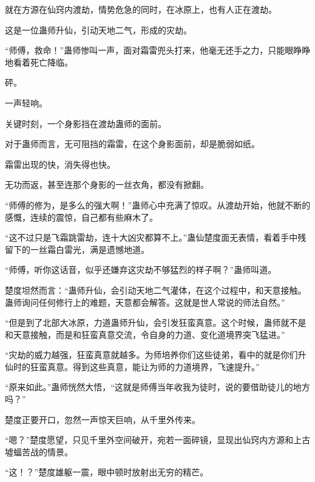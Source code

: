 \begin{this_body}
就在方源在仙窍内渡劫，情势危急的同时，在冰原上，也有人正在渡劫。

这是一位蛊师升仙，引动天地二气，形成的灾劫。

“师傅，救命！”蛊师惨叫一声，面对霜雷兜头打来，他毫无还手之力，只能眼睁睁地看着死亡降临。

砰。

一声轻响。

关键时刻，一个身影挡在渡劫蛊师的面前。

对于蛊师而言，无可阻挡的霜雷，在这个身影面前，却是脆弱如纸。

霜雷出现的快，消失得也快。

无功而返，甚至连那个身影的一丝衣角，都没有掀翻。

“师傅的修为，是多么的强大啊！”蛊师心中充满了惊叹。从渡劫开始，他就不断的感慨，连续的震惊，自己都有些麻木了。

“这不过只是飞霜跳雷劫，连十大凶灾都算不上。”蛊仙楚度面无表情，看着手中残留下的一丝霜白雷光，满是遗憾地道。

“师傅，听你这话音，似乎还嫌弃这灾劫不够猛烈的样子啊？”蛊师叫道。

楚度坦然而言：“蛊师升仙，会引动天地二气灌体，在这个过程中，和天意接触。蛊师询问任何修行上的难题，天意都会解答。这就是世人常说的师法自然。”

“但是到了北部大冰原，力道蛊师升仙，会引发狂蛮真意。这个时候，蛊师就不是和天意接触，而是和狂蛮真意交流，令自身的力道、变化道境界突飞猛进。”

“灾劫的威力越强，狂蛮真意就越多。为师培养你们这些徒弟，看中的就是你们升仙时的狂蛮真意。得到这些真意，能让为师的力道境界，飞速提升。”

“原来如此。”蛊师恍然大悟，“这就是师傅当年收我为徒时，说的要借助徒儿的地方吗？”

楚度正要开口，忽然一声惊天巨响，从千里外传来。

“嗯？”楚度愿望，只见千里外空间破开，宛若一面碎镜，显现出仙窍内方源和上古墟蝠苦战的情景。

“这！？”楚度雄躯一震，眼中顿时放射出无穷的精芒。

\end{this_body}

